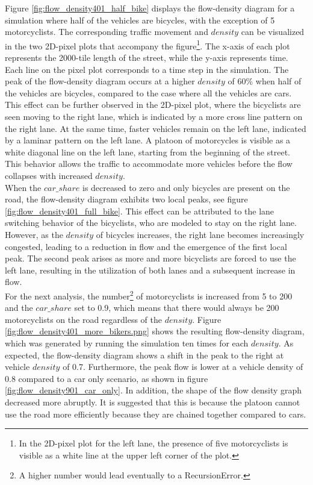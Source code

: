 Figure \ref{fig:flow_density401_half_bike} displays the flow-density diagram for a simulation where half of the vehicles are bicycles, with the exception of 5 motorcyclists. The corresponding traffic movement and $density$ can be visualized in the two 2D-pixel plots that accompany the figure\footnote{In the 2D-pixel plot for the left lane, the presence of five motorcyclists is visible as a white line at the upper left corner of the plot.}. The x-axis of each plot represents the 2000-tile length of the street, while the y-axis represents time. Each line on the pixel plot corresponds to a time step in the simulation. 
The peak of the flow-density diagram occurs at a higher $density$ of 60\% when half of the vehicles are bicycles, compared to the case where all the vehicles are cars. This effect can be further observed in the 2D-pixel plot, where the bicyclists are seen moving to the right lane, which is indicated by a more cross line pattern on the right lane. At the same time, faster vehicles remain on the left lane, indicated by a laminar pattern on the left lane. A platoon of motorcycles is visible as a white diagonal line on the left lane, starting from the beginning of the street. This behavior allows the traffic to accommodate more vehicles before the flow collapses with increased $density$.\\

When the $car\_share$ is decreased to zero and only bicycles are present on the road, the flow-density diagram exhibits two local peaks, see figure \ref{fig:flow_density401_full_bike}. This effect can be attributed to the lane switching behavior of the bicyclists, who are modeled to stay on the right lane. However, as the $density$ of bicycles increases, the right lane becomes increasingly congested, leading to a reduction in flow and the emergence of the first local peak. The second peak arises as more and more bicyclists are forced to use the left lane, resulting in the utilization of both lanes and a subsequent increase in flow. \\

For the next analysis, the number\footnote{A higher number would lead eventually to a RecursionError.} of motorcyclists is increased from 5 to 200 and the $car\_share$ set to 0.9, which means that there would always be 200 motorcyclists on the road regardless of the $density$. Figure \ref{fig:flow_density401_more_bikers.png} shows the resulting flow-density diagram, which was generated by running the simulation ten times for each $density$. As expected, the flow-density diagram shows a shift in the peak to the right at vehicle $density$ of 0.7. Furthermore, the peak flow is lower at a vehicle density of 0.8 compared to a car only scenario, as shown in figure \ref{fig:flow_density901_car_only}. In addition, the shape of the flow density graph decreased more abruptly. It is suggested that this is because the platoon cannot use the road more efficiently because they are chained together compared to cars. 


